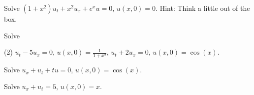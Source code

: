 \begin{exercise}
Solve $(1+x^2) u_t + x^2 u_x + e^x u = 0$, $u(x,0) = 0$.
Hint: Think a little out of the box.
\end{exercise}

\setcounter{exercise}{100}

\begin{exercise}
Solve
\begin{tasks}(2)
\task $u_t - 5u_x = 0$, \enspace $u(x,0) = \frac{1}{1+x^2}$,
\task $u_t + 2u_x = 0$, \enspace $u(x,0) = \cos(x)$.
\end{tasks}
\end{exercise}

\begin{exercise}
Solve $u_x+u_t+tu = 0$, $u(x,0) = \cos(x)$.
\end{exercise}

\begin{exercise}
Solve $u_x+u_t = 5$, $u(x,0) = x$.
\end{exercise}

